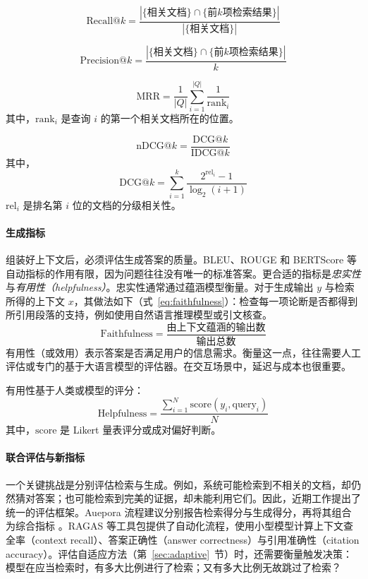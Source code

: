 \begin{equation}
\mathrm{Recall@}k = \frac{| \{ \text{相关文档} \} \cap \{ \text{前}k \text{项检索结果} \} |}{| \{ \text{相关文档} \} |}
\label{eq:recallk}
\end{equation}

\begin{equation}
\mathrm{Precision@}k = \frac{| \{ \text{相关文档} \} \cap \{ \text{前}k \text{项检索结果} \} |}{k}
\label{eq:precisionk}
\end{equation}

\begin{equation}
\mathrm{MRR} = \frac{1}{|Q|} \sum_{i=1}^{|Q|} \frac{1}{\mathrm{rank}_i}
\label{eq:MRR}
\end{equation}
其中，$\mathrm{rank}_i$ 是查询 $i$ 的第一个相关文档所在的位置。

\begin{equation}
\mathrm{nDCG@}k = \frac{\mathrm{DCG@}k}{\mathrm{IDCG@}k}
\label{eq:nDCG}
\end{equation}
其中，
\[
\mathrm{DCG@}k = \sum_{i=1}^k \frac{2^{\mathrm{rel}_i} - 1}{\log_2(i+1)}
\]
$\mathrm{rel}_i$ 是排名第 $i$ 位的文档的分级相关性。


\paragraph{生成指标} 组装好上下文后，必须评估生成答案的质量。BLEU、ROUGE 和 BERTScore 等自动指标的作用有限，因为问题往往没有唯一的标准答案。更合适的指标是\emph{忠实性}与\emph{有用性（helpfulness）}。忠实性通常通过蕴涵模型衡量。对于生成输出 $y$ 与检索所得的上下文 $x$，其做法如下（式~\ref{eq:faithfulness}）：检查每一项论断是否都得到所引用段落的支持，例如使用自然语言推理模型或引文核查。
\begin{equation}
    \mathrm{Faithfulness} = \frac{\text{由上下文蕴涵的输出数}}{\text{输出总数}}
    \label{eq:faithfulness}
\end{equation}
有用性（或效用）表示答案是否满足用户的信息需求。衡量这一点，往往需要人工评估或专门的基于大语言模型的评估器。在交互场景中，延迟与成本也很重要。

有用性基于人类或模型的评分：
\begin{equation}
\mathrm{Helpfulness} = \frac{\sum_{i=1}^N \text{score}(y_i, \text{query}_i)}{N}
\label{eq:helpfullness}
\end{equation}
其中，$\text{score}$ 是 Likert 量表评分或成对偏好判断。


\paragraph{联合评估与新指标} 一个关键挑战是分别评估检索与生成。例如，系统可能检索到不相关的文档，却仍然猜对答案；也可能检索到完美的证据，却未能利用它们。因此，近期工作提出了统一的评估框架。Auepora 流程建议分别报告检索得分与生成得分，再将其组合为综合指标 \citep{yu2024rag_eval}。RAGAS 等工具包提供了自动化流程，使用小型模型计算上下文查全率（context recall）、答案正确性（answer correctness）与引用准确性（citation accuracy）。评估自适应方法（第~\ref{sec:adaptive}~节）时，还需要衡量触发决策：模型在应当检索时，有多大比例进行了检索；又有多大比例无故跳过了检索？

